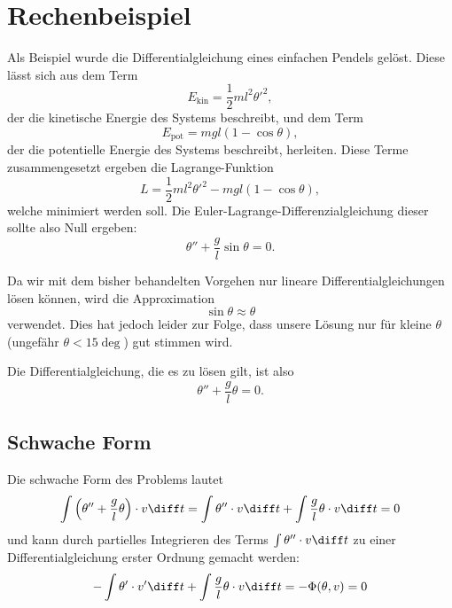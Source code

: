 %
%
%
%
\section{Rechenbeispiel\label{fem:rechenbsp}}

Als Beispiel wurde die Differentialgleichung eines einfachen Pendels gelöst. %
Diese lässt sich aus dem Term
\begin{equation}
    E_{\text{kin}} = \frac{1}{2} m l^2 {\theta'}^2,
\end{equation}
der die kinetische Energie des Systems beschreibt, und dem Term
\begin{equation}
    E_{\text{pot}} = m g l (1 - \cos \theta),
\end{equation}
der die potentielle Energie des Systems beschreibt, herleiten. 
Diese Terme zusammengesetzt ergeben die Lagrange-Funktion
\begin{equation}
    L = \frac{1}{2} m l^2 {\theta'}^2 - m g l (1 - \cos \theta),
\end{equation}
welche minimiert werden soll.
Die Euler-Lagrange-Differenzialgleichung dieser sollte also Null ergeben:
\begin{equation}
    \theta'' + \frac{g}{l} \sin \theta = 0.
\end{equation}

Da wir mit dem bisher behandelten Vorgehen nur lineare Differentialgleichungen lösen können, wird die Approximation
\begin{equation}
    \sin \theta \approx \theta
\end{equation}
verwendet. %
Dies hat jedoch leider zur Folge, dass unsere Lösung nur für kleine $\theta$ (ungefähr $\theta < 15 \deg$) gut stimmen wird.

Die Differentialgleichung, die es zu lösen gilt, ist also
\begin{equation}
    \theta'' + \frac{g}{l} \theta = 0.
\end{equation}


\subsection{Schwache Form}
Die schwache Form des Problems lautet
\begin{equation}
    \int \left( \theta'' + \frac{g}{l} \theta \right) \cdot v \diff t 
    = \int \theta'' \cdot v \diff t + \int \frac{g}{l} \theta \cdot v \diff t
    = 0
\end{equation}
und kann durch partielles Integrieren des Terms $\int \theta'' \cdot v \diff t$ zu einer Differentialgleichung erster Ordnung gemacht werden:
\begin{equation}
    - \int \theta' \cdot v' \diff t + \int \frac{g}{l} \theta \cdot v \diff t = -\Phi(\theta, v) = 0
    \label{fem:rechenbsp:schwache_form}
\end{equation}


